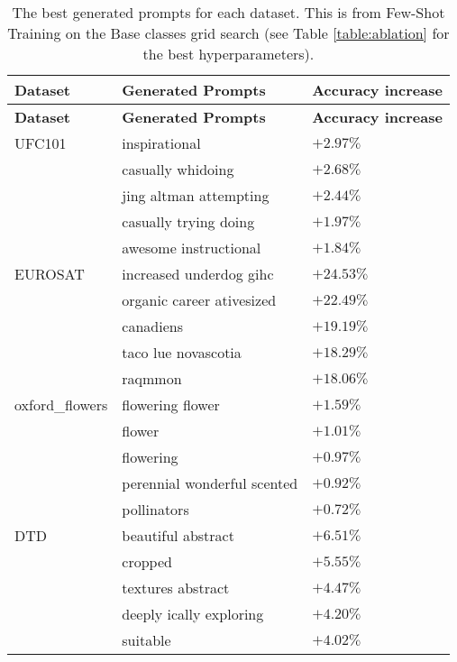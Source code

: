 \begin{longtable}{|>{\raggedright\arraybackslash}p{3cm}|>{\raggedright\arraybackslash}p{7cm}|>{\raggedright\arraybackslash}p{2cm}|}
\caption{The best generated prompts for each dataset. This is from Few-Shot Training on the Base classes grid search (see Table \ref{table:ablation} for the best hyperparameters). } \label{tab:prompts} \\
\hline
\textbf{Dataset} & \textbf{Generated Prompts} & \textbf{Accuracy increase} \\
\hline
\endfirsthead
\hline
\textbf{Dataset} & \textbf{Generated Prompts} & \textbf{Accuracy increase} \\
\hline
\endhead
\hline
\endfoot

UFC101 & inspirational & $+2.97\%$ \\
       & casually whidoing & $+2.68\%$ \\
       & jing altman attempting & $+2.44\%$ \\
       & casually trying doing & $+1.97\%$ \\
       & awesome instructional & $+1.84\%$ \\
\hline

EUROSAT & increased underdog gihc & $+24.53\%$ \\
        & organic career ativesized & $+22.49\%$ \\
        & canadiens & $+19.19\%$ \\
        & taco lue novascotia & $+18.29\%$ \\
        & raqmmon & $+18.06\%$ \\
\hline

oxford\_flowers & flowering flower & $+1.59\%$ \\
                & flower & $+1.01\%$ \\
                & flowering & $+0.97\%$ \\
                & perennial wonderful scented & $+0.92\%$ \\
                & pollinators & $+0.72\%$ \\
\hline

DTD & beautiful abstract & $+6.51\%$ \\
    & cropped & $+5.55\%$ \\
    & textures abstract & $+4.47\%$ \\
    & deeply ically exploring & $+4.20\%$ \\
    & suitable & $+4.02\%$ \\
\hline


\end{longtable}
